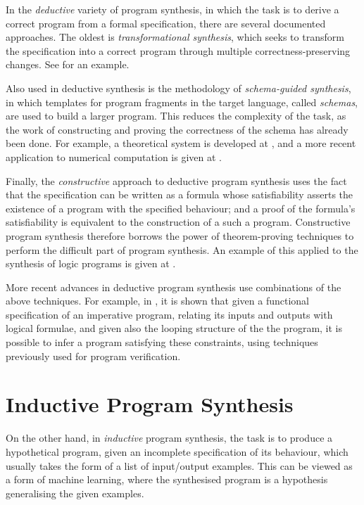 \documentclass[a4paper,twoside,notitlepage]{report}
\begin{document}
In the \emph{deductive} variety of program synthesis, in which the task is to 
derive a correct program from a formal specification, there are several 
documented approaches. The oldest is \emph{transformational synthesis}, which 
seeks to transform the specification into a correct program through multiple 
correctness-preserving changes. See \cite{cheatham86} for an example.

Also used in deductive synthesis is the methodology of \emph{schema-guided 
synthesis}, in which templates for program fragments in the target language, 
called \emph{schemas}, are used to build a larger program. This reduces the 
complexity of the task, as the work of constructing and proving the 
correctness of the schema has already been done. For example, a theoretical 
system is developed at \cite{flener97}, and a more recent application to 
numerical computation is given at \cite{colon05}.

Finally, the \emph{constructive} approach to deductive program synthesis uses 
the fact that the specification can be written as a formula whose 
satisfiability asserts the existence of a program with the specified 
behaviour; and a proof of the formula's satisfiability is equivalent to the 
construction of a such a program. Constructive program synthesis therefore 
borrows the power of theorem-proving techniques to perform the difficult part 
of program synthesis. An example of this applied to the synthesis of logic 
programs is given at \cite{bundy90}.

More recent advances in deductive program synthesis use combinations of the 
above techniques. For example, in \cite{popl10syn}, it is shown that given a 
functional specification of an imperative program, relating its inputs and 
outputs with logical formulae, and given also the looping structure of the the 
program, it is possible to infer a program satisfying these constraints, using 
techniques previously used for program verification.

\section{Inductive Program Synthesis}

On the other hand, in \emph{inductive} program synthesis, the task is to 
produce a hypothetical program, given an incomplete specification of its 
behaviour, which usually takes the form of a list of input/output examples. 
This can be viewed as a form of machine learning, where the synthesised 
program is a hypothesis generalising the given examples.
\end{document}
